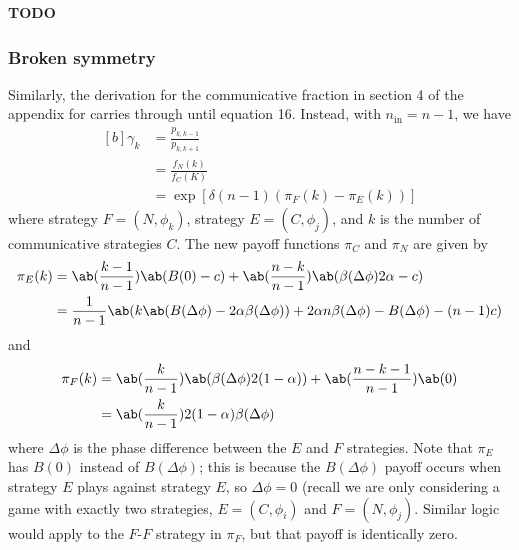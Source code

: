 \documentclass[pdflatex,lineno,referee,sn-mathphys-ay]{class/sn-jnl}
\begin{document}
\textbf{TODO}

\subsubsection{Broken symmetry}
Similarly, the derivation for the communicative fraction
in section 4 of the appendix for \cite{tripp2022evolutionary} carries
through until equation 16.
Instead, with $n_{\text{in}} = n-1$, we have
\begin{equation}
  \begin{aligned}[b]
  \gamma_k &= \frac{p_{k,k-1}}{p_{k,k+1}} \\
           &= \frac{f_N(k)}{f_C(K)} \\
           &= \exp[\delta (n-1) (\pi_F(k) - \pi_E(k))]
\end{aligned}
\end{equation}
where strategy $F=(N,\phi_k)$, strategy $E=(C,\phi_j)$, and $k$ is the
number of communicative strategies $C$.
The new payoff functions $\pi_C$ and $\pi_N$ are given by
\begin{align}
  \pi_E(k) &= \ab(\frac{k-1}{n-1}) \ab(B(0) - c)
                + \ab(\frac{n-k}{n-1}) \ab(\beta(\Delta\phi) 2\alpha - c) \\
           &= \frac{1}{n-1}
               \ab(k \ab(B(\Delta\phi) - 2 \alpha \beta(\Delta\phi))
                 + 2 \alpha n \beta(\Delta\phi) - B(\Delta\phi) - (n-1) c)
\end{align}
and
\begin{align}
  \pi_F(k) &= \ab(\frac{k}{n-1}) \ab(\beta(\Delta\phi) 2 (1-\alpha))
                + \ab(\frac{n-k-1}{n-1}) \ab(0) \\
           &= \ab(\frac{k}{n-1}) 2 (1-\alpha) \beta(\Delta\phi)
\end{align}
where $\Delta \phi$ is the phase difference between the $E$ and $F$
strategies.
Note that $\pi_E$ has $B(0)$ instead of $B(\Delta \phi)$; this is
because the $B(\Delta \phi)$ payoff occurs when strategy $E$ plays
against strategy $E$, so $\Delta \phi = 0$ (recall we are only
considering a game with exactly two strategies, $E = (C, \phi_i)$ and
$F = (N, \phi_j)$.
Similar logic would apply to the $F$-$F$ strategy in $\pi_F$, but that
payoff is identically zero.
\end{document}
